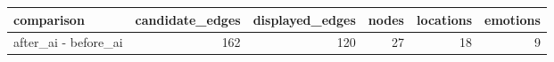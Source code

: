 \begin{tabular}{lrrrrr}
\toprule
comparison & candidate\_edges & displayed\_edges & nodes & locations & emotions \\
\midrule
after\_ai - before\_ai & 162 & 120 & 27 & 18 & 9 \\
\bottomrule
\end{tabular}
